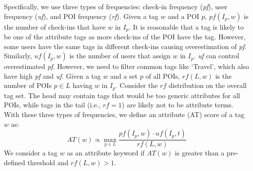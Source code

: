 Specifically, we use three types of frequencies: check-in frequency (\emph{pf}), user frequency (\emph{uf}), and POI frequency (\emph{rf}). Given a tag $w$ and a POI $p$, $pf(I_{p},w)$ is the number of check-ins that have $w$ in $I_{p}$. It is reasonable that a tag is likely to be one of the attribute tags as more check-ins of the POI have the tag. However, some users have the same tags in different check-ins causing overestimation of \emph{pf}. Similarly, $uf(I_{p},w)$ is the number of users that assign $w$ in $I_{p}$. \emph{uf} can control overestimated \emph{pf}. However, we need to filter common tags like `Travel', which also have high \emph{pf} and \emph{uf}.
Given a tag $w$ and a set $p$ of all POIs, $rf(L,w)$ is the number of POIs $p \in L$ having $w$ in $I_{p}$. Consider the $rf$ distribution on the overall tag set. The head may contain tags that would be too generic attributes for all POIs, while tags in the tail (i.e., $rf=1$) are likely not to be attribute terms. With these three types of frequencies, we define an attribute (\textsf{AT}) score of a tag $w$ as:
\begin{equation}
AT(w) \propto \max_{p \in L} \frac {pf(I_{p},w)\cdot uf(I_{p},t)}{rf(L,w)}
\end{equation}
We consider a tag $w$ as an attribute keyword if $AT(w)$ is greater than a pre-defined threshold and $rf(L,w)>1$.
